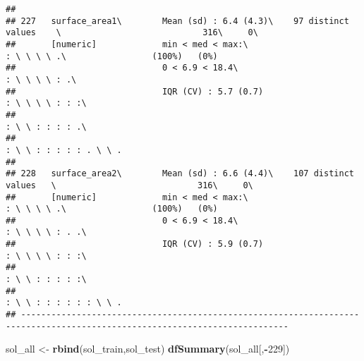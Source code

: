 \documentclass[]{article}
\newenvironment{Shaded}{\begin{snugshade}}{\end{snugshade}}
\newcommand{\DecValTok}[1]{\textcolor[rgb]{0.00,0.00,0.81}{#1}}
\newcommand{\KeywordTok}[1]{\textcolor[rgb]{0.13,0.29,0.53}{\textbf{#1}}}
\newcommand{\NormalTok}[1]{#1}
\newcommand{\OperatorTok}[1]{\textcolor[rgb]{0.81,0.36,0.00}{\textbf{#1}}}
\newcommand{\StringTok}[1]{\textcolor[rgb]{0.31,0.60,0.02}{#1}}
\begin{document}
\begin{verbatim}
## 
## 227   surface_area1\        Mean (sd) : 6.4 (4.3)\    97 distinct values    \                            316\     0\       
##       [numeric]             min < med < max:\                               : \ \ \ \ .\                 (100%)   (0%)     
##                             0 < 6.9 < 18.4\                                 : \ \ \ \ : .\                                 
##                             IQR (CV) : 5.7 (0.7)                            : \ \ \ \ : : :\                               
##                                                                             : \ \ : : : : .\                               
##                                                                             : \ \ : : : : : . \ \ .                        
## 
## 228   surface_area2\        Mean (sd) : 6.6 (4.4)\    107 distinct values   \                            316\     0\       
##       [numeric]             min < med < max:\                               : \ \ \ \ .\                 (100%)   (0%)     
##                             0 < 6.9 < 18.4\                                 : \ \ \ \ : . .\                               
##                             IQR (CV) : 5.9 (0.7)                            : \ \ \ \ : : :\                               
##                                                                             : \ \ : : : : :\                               
##                                                                             : \ \ : : : : : : \ \ .                        
## ---------------------------------------------------------------------------------------------------------------------------
\end{verbatim}

\begin{Shaded}
\begin{Highlighting}[]
\NormalTok{sol_all <-}\StringTok{ }\KeywordTok{rbind}\NormalTok{(sol_train,sol_test)}
\KeywordTok{dfSummary}\NormalTok{(sol_all[,}\OperatorTok{-}\DecValTok{229}\NormalTok{])}
\end{Highlighting}
\end{Shaded}
\end{document}
